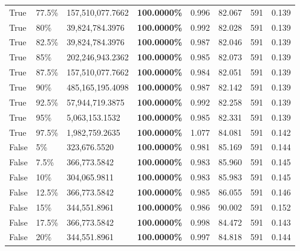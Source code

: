 \begin{table}[H]
\begin{tabular}{lllrllll}
\cline{1-8} \cline{2-8}
True & 77.5\% & 157,510,077.7662 & \bfseries \color{red} 100.0000\% & 0.996 & 82.067 & 591 & 0.139 \\
\cline{1-8} \cline{2-8}
True & 80\% & 39,824,784.3976 & \bfseries \color{red} 100.0000\% & 0.992 & 82.028 & 591 & 0.139 \\
\cline{1-8} \cline{2-8}
True & 82.5\% & 39,824,784.3976 & \bfseries \color{red} 100.0000\% & 0.987 & 82.046 & 591 & 0.139 \\
\cline{1-8} \cline{2-8}
True & 85\% & 202,246,943.2362 & \bfseries \color{red} 100.0000\% & 0.985 & 82.073 & 591 & 0.139 \\
\cline{1-8} \cline{2-8}
True & 87.5\% & 157,510,077.7662 & \bfseries \color{red} 100.0000\% & 0.984 & 82.051 & 591 & 0.139 \\
\cline{1-8} \cline{2-8}
True & 90\% & 485,165,195.4098 & \bfseries \color{red} 100.0000\% & 0.987 & 82.142 & 591 & 0.139 \\
\cline{1-8} \cline{2-8}
True & 92.5\% & 57,944,719.3875 & \bfseries \color{red} 100.0000\% & 0.992 & 82.258 & 591 & 0.139 \\
\cline{1-8} \cline{2-8}
True & 95\% & 5,063,153.1532 & \bfseries \color{red} 100.0000\% & 0.985 & 82.331 & 591 & 0.139 \\
\cline{1-8} \cline{2-8}
True & 97.5\% & 1,982,759.2635 & \bfseries \color{red} 100.0000\% & 1.077 & 84.081 & 591 & 0.142 \\
\cline{1-8} \cline{2-8}
False & 5\% & 323,676.5520 & \bfseries \color{red} 100.0000\% & 0.981 & 85.169 & 591 & 0.144 \\
\cline{1-8} \cline{2-8}
False & 7.5\% & 366,773.5842 & \bfseries \color{red} 100.0000\% & 0.983 & 85.960 & 591 & 0.145 \\
\cline{1-8} \cline{2-8}
False & 10\% & \color{red} 304,065.9811 & \bfseries \color{red} 100.0000\% & 0.983 & 85.983 & 591 & 0.145 \\
\cline{1-8} \cline{2-8}
False & 12.5\% & 366,773.5842 & \bfseries \color{red} 100.0000\% & 0.985 & 86.055 & 591 & 0.146 \\
\cline{1-8} \cline{2-8}
False & 15\% & 344,551.8961 & \bfseries \color{red} 100.0000\% & 0.986 & 90.002 & 591 & 0.152 \\
\cline{1-8} \cline{2-8}
False & 17.5\% & 366,773.5842 & \bfseries \color{red} 100.0000\% & 0.998 & 84.472 & 591 & 0.143 \\
\cline{1-8} \cline{2-8}
False & 20\% & 344,551.8961 & \bfseries \color{red} 100.0000\% & 0.997 & 84.818 & 591 & 0.144 \\

\end{tabular}
\end{table}
